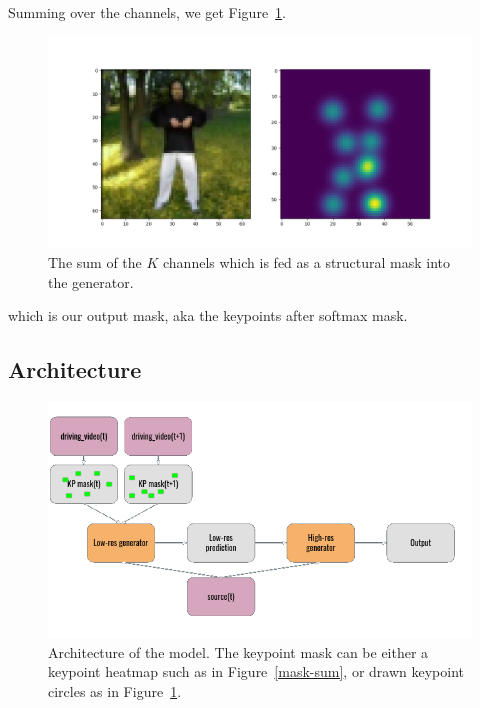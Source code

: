 \documentclass{article}
\begin{document}
Summing over the channels, we get Figure~\ref{softmax-sum}.

\begin{figure}[ht]
\vskip 0.2in
\begin{center}
\centerline{\includegraphics[width=\columnwidth]{visualizations/softmax_sumkp}}
\caption{
The sum of the $K$ channels which is fed as a structural mask into the
generator.
}
\label{softmax-sum}
\end{center}
\vskip -0.2in
\end{figure}
which is our output mask, aka the keypoints after softmax mask.

\subsection{Architecture}
\label{method}

\begin{figure}[ht]
\vskip 0.2in
\begin{center}
\centerline{\includegraphics[width=\columnwidth]{visualizations/architecture}}
\caption{Architecture of the model. The keypoint mask can be either a
keypoint heatmap such as in Figure~\ref{mask-sum}, or drawn keypoint
circles as in Figure~\ref{softmax-sum}.}
\label{arch}
\end{center}
\vskip -0.2in
\end{figure}
\end{document}

